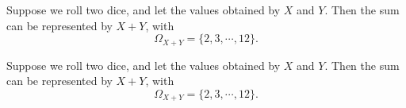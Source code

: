 \begin{note}
  \begin{field}
    \begin{eg}
      Suppose we roll two dice, and let the values obtained by $X$ and $Y$. Then the sum can be represented by $X + Y$, with
      \[
        \Omega_{X + Y} = \{2, 3, \cdots, 12\}.
      \]
    \end{eg}
  \end{field}
  \begin{field}
    \begin{eg}
      Suppose we roll two dice, and let the values obtained by $X$ and $Y$. Then the sum can be represented by $X + Y$, with
      \[
        \Omega_{X + Y} = \{2, 3, \cdots, 12\}.
      \]
    \end{eg}
  \end{field}
  \xplain{}%
\end{note}

